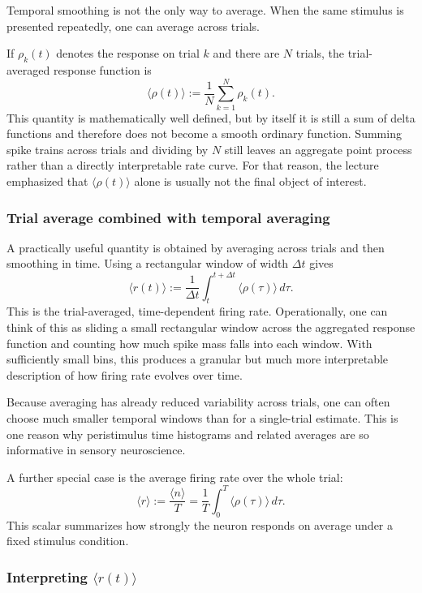 \documentclass[11pt]{article}
\begin{document}
Temporal smoothing is not the only way to average. When the same stimulus is presented repeatedly, one can average across trials.

If $\rho_k(t)$ denotes the response on trial $k$ and there are $N$ trials, the trial-averaged response function is
\[
\langle \rho(t) \rangle := \frac{1}{N}\sum_{k=1}^{N} \rho_k(t).
\]
This quantity is mathematically well defined, but by itself it is still a sum of delta functions and therefore does not become a smooth ordinary function. Summing spike trains across trials and dividing by $N$ still leaves an aggregate point process rather than a directly interpretable rate curve. For that reason, the lecture emphasized that $\langle \rho(t) \rangle$ alone is usually not the final object of interest.

\subsubsection{Trial average combined with temporal averaging}

A practically useful quantity is obtained by averaging across trials and then smoothing in time. Using a rectangular window of width $\Delta t$ gives
\[
\langle r(t) \rangle := \frac{1}{\Delta t}
\int_t^{t+\Delta t} \langle \rho(\tau) \rangle\,d\tau.
\]
This is the trial-averaged, time-dependent firing rate. Operationally, one can think of this as sliding a small rectangular window across the aggregated response function and counting how much spike mass falls into each window. With sufficiently small bins, this produces a granular but much more interpretable description of how firing rate evolves over time.

Because averaging has already reduced variability across trials, one can often choose much smaller temporal windows than for a single-trial estimate. This is one reason why peristimulus time histograms and related averages are so informative in sensory neuroscience.

A further special case is the average firing rate over the whole trial:
\[
\langle r \rangle := \frac{\langle n \rangle}{T}
= \frac{1}{T}\int_0^T \langle \rho(\tau) \rangle\,d\tau.
\]
This scalar summarizes how strongly the neuron responds on average under a fixed stimulus condition.

\subsubsection{Interpreting $\langle r(t) \rangle$}
\end{document}
